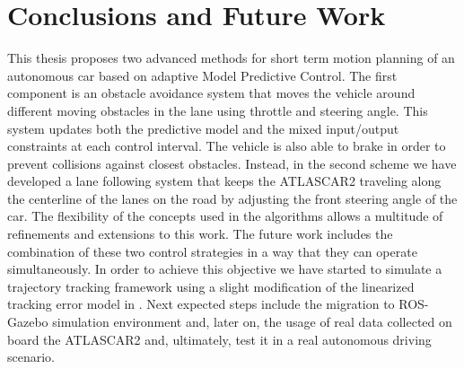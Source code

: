\chapter{Conclusions and Future Work}
This thesis proposes two advanced methods for short term motion planning of an autonomous car based on adaptive Model Predictive Control. The first component is an obstacle avoidance system that moves the vehicle around different moving obstacles in the lane using throttle and steering angle. This system updates both the predictive model and the mixed input/output constraints at each control interval. The vehicle is also able to brake in order to prevent collisions against closest obstacles. Instead, in the second scheme  we have developed a lane following system that keeps the ATLASCAR2 traveling along the centerline of the lanes on the road by adjusting the front steering angle of the car.  The flexibility of the concepts used in the algorithms allows a multitude of refinements and extensions to this work. The future work includes the combination of these two control strategies in a way that they can operate simultaneously. In order to achieve this objective we have started to simulate a trajectory tracking framework using a slight modification of the linearized tracking error model in \cite{error_model}. Next expected steps include the migration to ROS-Gazebo simulation environment and, later on, the usage of real data collected on board the ATLASCAR2 and, ultimately, test it in a real autonomous driving scenario.